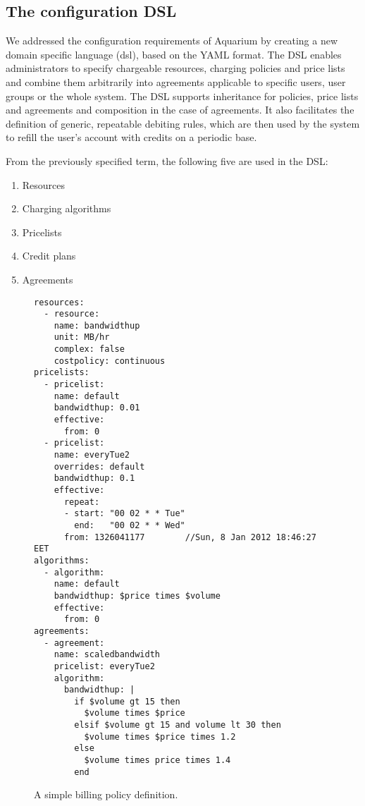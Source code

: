 \documentclass[preprint,10pt]{sigplanconf}
\begin{document}
\subsection{The configuration DSL}
\label{sec:dsl}
We addressed the configuration requirements of Aquarium by creating a new
domain specific language ({\sc dsl}), based on the YAML format.  The DSL
enables administrators to specify chargeable resources, charging policies and
price lists and combine them arbitrarily into agreements applicable to specific
users, user groups or the whole system. 
The DSL supports inheritance for policies, price lists and agreements and composition in the case of agreements.
It also facilitates the
definition of generic, repeatable debiting rules, which are then used by the
system to refill the user's account with credits on a periodic base.

From the previously specified term, the following five are used in the DSL:

\begin{enumerate}
\item Resources
\item Charging algorithms
\item Pricelists
\item Credit plans
\item Agreements
\end{enumerate}


\begin{figure}
\lstset{language=c, basicstyle=\footnotesize,
stringstyle=\ttfamily, 
flexiblecolumns=true, aboveskip=-0.9em, belowskip=0em, lineskip=0em}

\begin{lstlisting}
resources:
  - resource:
    name: bandwidthup
    unit: MB/hr
    complex: false
    costpolicy: continuous
pricelists:
  - pricelist: 
    name: default
    bandwidthup: 0.01
    effective:
      from: 0
  - pricelist: 
    name: everyTue2
    overrides: default
    bandwidthup: 0.1
    effective:
      repeat:
      - start: "00 02 * * Tue"
        end:   "00 02 * * Wed"
      from: 1326041177        //Sun, 8 Jan 2012 18:46:27 EET
algorithms:
  - algorithm:
    name: default
    bandwidthup: $price times $volume
    effective:
      from: 0
agreements:
  - agreement:
    name: scaledbandwidth
    pricelist: everyTue2
    algorithm:
      bandwidthup: |
        if $volume gt 15 then
          $volume times $price
        elsif $volume gt 15 and volume lt 30 then
          $volume times $price times 1.2
        else
          $volume times price times 1.4
        end
\end{lstlisting}

\caption{A simple billing policy definition.} 
\label{fig:dsl}
\end{figure}
\end{document}
